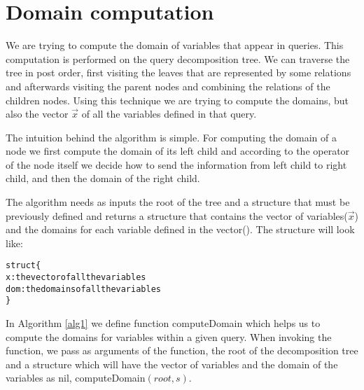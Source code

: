 \documentclass[12pt]{article}
\begin{document}
\section{Domain computation}

We are trying to compute the domain of variables that appear in queries. This computation is performed on the query decomposition tree. We can traverse the tree in post order, first visiting the leaves that are represented by some relations and afterwards visiting the parent nodes and combining the relations of the children nodes. Using this technique we are trying to compute the domains, but also the vector $\vec x$ of all the variables defined in that query.

The intuition behind the algorithm is simple. For computing the domain of a node we first compute the domain of its left child and according to the operator of the node itself we decide how to send the information from left child to right child, and then the domain of the right child.

The algorithm needs as inputs the root of the tree and a structure that must be previously defined and returns a structure that contains the vector of variables($\vec{x}$) and the domains for each variable defined in the vector(\dom). The structure will look like:

\begin{alltt}
struct \{
x: the vector of all the variables 
dom: the domains of all the variables
\}
\end{alltt}

In Algorithm \ref{alg1} we define function \textsf{computeDomain} which helps us to compute the domains for variables within a given query. When invoking the function, we pass as arguments of the function, the root of the decomposition tree and a structure which will have the vector of variables and the domain of the variables as nil, \textsf{computeDomain}$(root,s)$.
\end{document}
